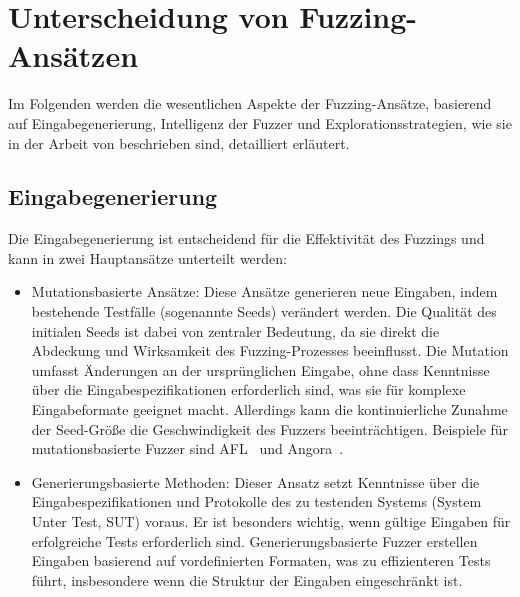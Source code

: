 
\section{Unterscheidung von Fuzzing-Ansätzen}\label{sec:unterscheidung-von-fuzzern}
Im Folgenden werden die wesentlichen Aspekte der Fuzzing-Ansätze, basierend auf Eingabegenerierung, Intelligenz der Fuzzer
und Explorationsstrategien, wie sie in der Arbeit von \citet{eceiza_fuzzing_2021} beschrieben sind, detailliert erläutert.
\subsection{Eingabegenerierung}\label{subsec:input-generation}
Die Eingabegenerierung ist entscheidend für die Effektivität des Fuzzings und kann in zwei Hauptansätze unterteilt werden:
\begin{itemize}
    \item Mutationsbasierte Ansätze: Diese Ansätze generieren neue Eingaben, indem bestehende Testfälle (sogenannte Seeds) 
    verändert werden. 
    Die Qualität des initialen Seeds ist dabei von zentraler Bedeutung, da sie direkt die Abdeckung und Wirksamkeit des 
    Fuzzing-Prozesses beeinflusst. 
    Die Mutation umfasst Änderungen an der ursprünglichen Eingabe, ohne dass Kenntnisse über die Eingabespezifikationen 
    erforderlich sind, was sie für komplexe Eingabeformate geeignet macht. 
    Allerdings kann die kontinuierliche Zunahme der Seed-Größe die Geschwindigkeit des Fuzzers beeinträchtigen. 
    Beispiele für mutationsbasierte Fuzzer sind AFL~\cite{afl} und Angora~\cite{chen_angora_2018}.
    \item Generierungsbasierte Methoden: Dieser Ansatz setzt Kenntnisse über die Eingabespezifikationen und Protokolle 
    des zu testenden Systems (System Unter Test, SUT) voraus.
    Er ist besonders wichtig, wenn gültige Eingaben für erfolgreiche Tests erforderlich sind. 
    Generierungsbasierte Fuzzer erstellen Eingaben basierend auf vordefinierten Formaten, was zu effizienteren Tests führt, 
    insbesondere wenn die Struktur der Eingaben eingeschränkt ist.
\end{itemize}
